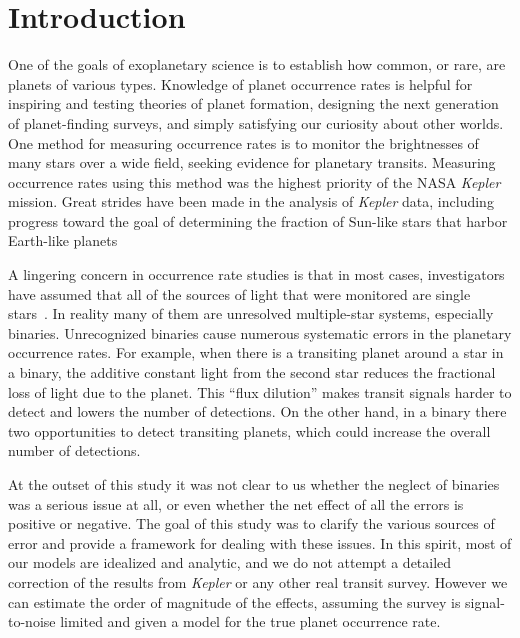 \documentclass[12pt,modern]{aastex61}
\begin{document}
\section{Introduction}

One of the goals of exoplanetary science is to establish how common,
or rare, are planets of various types.  Knowledge of planet occurrence
rates is helpful for inspiring and testing theories of planet
formation, designing the next generation of planet-finding surveys,
and simply satisfying our curiosity about other worlds.  One method
for measuring occurrence rates is to monitor the brightnesses of many
stars over a wide field, seeking evidence for planetary transits.
Measuring occurrence rates using this method was the highest priority
of the NASA {\it Kepler} mission.  Great strides have been made in the
analysis of {\it Kepler} data, including
progress toward the goal of determining the fraction of
Sun-like stars that harbor Earth-like 
planets~\citep{
    youdin_exoplanet_2011,petigura_prevalence_2013,dong_fast_2013,
    foreman-mackey_exoplanet_2014,burke_terrestrial_2015}

A lingering concern in occurrence rate studies is that in most cases,
investigators have assumed that all of the sources of light that were
monitored are single 
stars~\citep[\textit{e.g.},][]{
    howard_planet_2012,fressin_false_2013,foreman-mackey_exoplanet_2014,
    dressing_occurrence_2015,burke_terrestrial_2015}. In reality many of them 
are unresolved multiple-star systems, especially binaries.  Unrecognized
binaries cause numerous systematic errors in the planetary occurrence
rates.  For example, when there is a transiting planet around a star
in a binary, the additive constant light from the second star reduces
the fractional loss of light due to the planet.  
This ``flux dilution'' makes transit signals harder to detect and lowers the 
number of detections.  On the other hand, in a binary there two opportunities
to detect transiting planets, which could increase the overall number
of detections.

At the outset of this study it was not clear to us whether the neglect
of binaries was a serious issue at all, or even whether the net effect
of all the errors is positive or negative.  The goal of this study was
to clarify the various sources of error and provide a framework for
dealing with these issues.  In this spirit, most of our models are
idealized and analytic, and we do not attempt a detailed correction of
the results from {\it Kepler} or any other real transit survey.
However we can estimate the order of magnitude of the effects,
assuming the survey is signal-to-noise limited and given a model for
the true planet occurrence rate.
\end{document}
